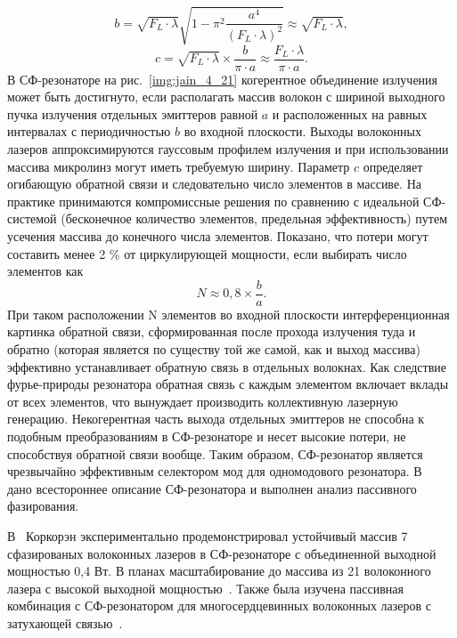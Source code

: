 \begin{equation}\label{eq4.4-2}
  b=\sqrt{F_L\cdot\lambda}\sqrt{1-\pi^2\frac{a^4}{(F_L\cdot\lambda)^2}}\approx\sqrt{F_L\cdot\lambda},
\end{equation}
\begin{equation}\label{eq4.4-3}
  c=\sqrt{F_L\cdot\lambda}\times\frac{b}{\pi\cdot a}\approx\frac{F_L\cdot\lambda}{\pi\cdot a}.
\end{equation}
В СФ-резонаторе на рис.~\ref{img:jain_4_21} когерентное объединение излучения может быть достигнуто, если располагать массив волокон с шириной выходного пучка излучения отдельных эмиттеров равной $a$ и расположенных на равных интервалах с периодичностью $b$ во входной плоскости. Выходы волоконных лазеров аппроксимируются гауссовым профилем излучения и при использовании массива микролинз могут иметь требуемую ширину. Параметр $c$ определяет огибающую обратной связи и следовательно число элементов в массиве. На практике принимаются компромиссные решения по сравнению с идеальной СФ-системой (бесконечное количество элементов, предельная эффективность) путем усечения массива до конечного числа элементов. Показано, что потери могут составить менее 2 \% от циркулирующей мощности, если выбирать число элементов как~\cite{Jain164}
\begin{equation}\label{eq4.4-4}
  N\approx0,8\times\frac{b}{a}.
\end{equation}
При таком расположении N элементов во входной плоскости интерференционная картинка обратной связи, сформированная после прохода излучения туда и обратно (которая является по существу той же самой, как и выход массива) эффективно устанавливает обратную связь в отдельных волокнах. Как следствие фурье-природы резонатора обратная связь с каждым элементом включает вклады от всех элементов, что вынуждает производить коллективную лазерную генерацию. Некогерентная часть выхода отдельных эмиттеров не способна к подобным преобразованиям в СФ-резонаторе и несет высокие потери, не способствуя обратной связи вообще. Таким образом, СФ-резонатор является чрезвычайно эффективным селектором мод для одномодового резонатора. В~\cite{Jain164,Jain165,Jain166} дано всестороннее описание СФ-резонатора и выполнен анализ пассивного фазирования.

В~\cite{Jain167} Коркорэн экспериментально продемонстрировал устойчивый массив 7 сфазированых волоконных лазеров в СФ-резонаторе с объединенной выходной мощностью 0,4 Вт. В планах масштабирование до массива из 21 волоконного лазера с высокой выходной мощностью~\cite{Jain168}. Также была изучена пассивная комбинация с СФ-резонатором для многосердцевинных волоконных лазеров с затухающей связью~\cite{Jain166}.

